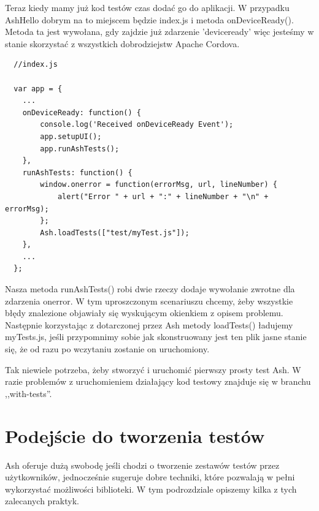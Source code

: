 \documentclass[brudnopis]{xmgr}
\begin{document}
\begin{enumerate}
Teraz kiedy mamy już kod testów czas dodać go do aplikacji. W przypadku AshHello dobrym na to miejscem będzie index.js i metoda onDeviceReady(). Metoda ta jest wywołana, gdy zajdzie już zdarzenie 'deviceready' więc jesteśmy w stanie skorzystać z wszystkich dobrodziejstw Apache Cordova.

 \begin{lstlisting}
  //index.js
  
  var app = {
	...
    onDeviceReady: function() {
        console.log('Received onDeviceReady Event');
        app.setupUI();
        app.runAshTests();
    },
    runAshTests: function() {
        window.onerror = function(errorMsg, url, lineNumber) {
            alert("Error " + url + ":" + lineNumber + "\n" + errorMsg);
        };
        Ash.loadTests(["test/myTest.js"]);
    },
	...
  };

\end{lstlisting}

Nasza metoda runAshTests() robi dwie rzeczy dodaje wywołanie zwrotne dla zdarzenia onerror. W tym uproszczonym scenariuszu chcemy, żeby wszystkie błędy znalezione objawiały się wyskującym okienkiem z opisem problemu. Następnie korzystając z dotarczonej przez Ash metody loadTests() ładujemy myTests.js, jeśli przypomnimy sobie jak skonstruowany jest ten plik jasne stanie się, że od razu po wczytaniu zostanie on uruchomiony. 

\end{enumerate}

Tak niewiele potrzeba, żeby stworzyć i uruchomić pierwszy prosty test Ash. W razie problemów z uruchomieniem działający kod testowy znajduje się w branchu ,,with-tests''.

\section{Podejście do tworzenia testów}

Ash oferuje dużą swobodę jeśli chodzi o tworzenie zestawów testów przez użytkowników, jednocześnie sugeruje dobre techniki, które pozwalają w pełni wykorzystać możliwości biblioteki. W tym podrozdziale opiszemy kilka z tych zalecanych praktyk.    
\end{document}
